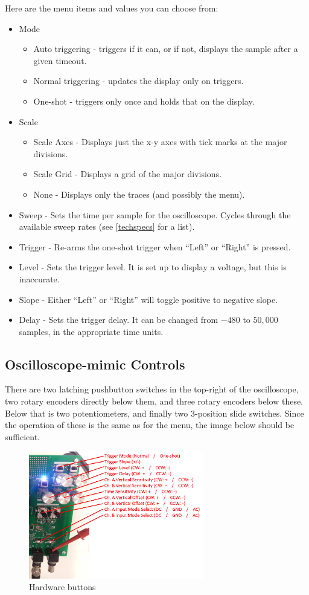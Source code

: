 Here are the menu items and values you can choose from:
\begin{itemize}
	\item Mode
		\begin{itemize}
			\item Auto triggering - triggers if it can, or if not, displays the sample after a given timeout.
			\item Normal triggering - updates the display only on triggers.
			\item One-shot - triggers only once and holds that on the display.
		\end{itemize}
	\item Scale
		\begin{itemize}
			\item Scale Axes - Displays just the x-y axes with tick marks at the major divisions.
			\item Scale Grid - Displays a grid of the major divisions.
			\item None - Displays only the traces (and possibly the menu).
		\end{itemize}
	\item Sweep - Sets the time per sample for the oscilloscope. Cycles through the available sweep rates (see \ref{techspecs} for a list).
	\item Trigger - Re-arms the one-shot trigger when ``Left'' or ``Right'' is pressed.
	\item Level - Sets the trigger level. It is set up to display a voltage, but this is inaccurate.
	\item Slope - Either ``Left'' or ``Right'' will toggle positive to negative slope.
	\item Delay - Sets the trigger delay. It can be changed from $-480$ to $50,000$ samples, in the appropriate time units.
\end{itemize}

\subsection{Oscilloscope-mimic Controls}
There are two latching pushbutton switches in the top-right of the oscilloscope, two rotary encoders directly below them, and three rotary encoders below these. Below that is two potentiometers, and finally two 3-position slide switches. Since the operation of these is the same as for the menu, the image below should be sufficient.

\begin{figure}[ht!]
    \centering
    \includegraphics[width=3in]{images/hardware_buttons.png}
		\caption{Hardware buttons}
\end{figure}


